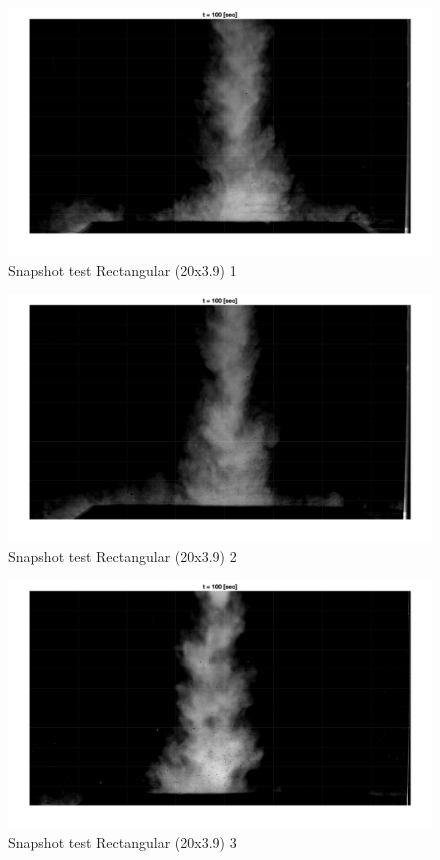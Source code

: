 




\begin{figure}[ht!]
    \centering
    \includegraphics[width=\linewidth]{Images/Rec20_1_t100.jpg}
    \caption{Snapshot test Rectangular (20x3.9) 1}
\end{figure}

\begin{figure}[ht!]
    \centering
    \includegraphics[width=\linewidth]{Images/Rec20_2_t100.jpg}
    \caption{Snapshot test Rectangular (20x3.9) 2}
\end{figure}

\begin{figure}[ht!]
    \centering
    \includegraphics[width=\linewidth]{Images/Rec20_3_t100.jpg}
    \caption{Snapshot test Rectangular (20x3.9) 3}
\end{figure}

